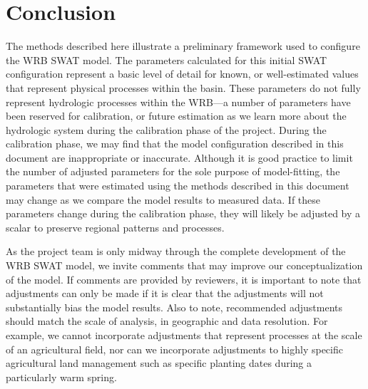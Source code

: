 \section{Conclusion}
The methods described here illustrate a preliminary framework used to configure the WRB SWAT model. The parameters calculated for this initial SWAT configuration represent a basic level of detail for known, or well-estimated values that represent physical processes within the basin. These parameters do not fully represent hydrologic processes within the WRB---a number of parameters have been reserved for calibration, or future estimation as we learn more about the hydrologic system during the calibration phase of the project. During the calibration phase, we may find that the model configuration described in this document are inappropriate or inaccurate. Although it is good practice to limit the number of adjusted parameters for the sole purpose of model-fitting, the parameters that were estimated using the methods described in this document may change as we compare the model results to measured data. If these parameters change during the calibration phase, they will likely be adjusted by a scalar to preserve regional patterns and processes.

As the project team is only midway through the complete development of the WRB SWAT model, we invite comments that may improve our conceptualization of the model. If comments are provided by reviewers, it is important to note that adjustments can only be made if it is clear that the adjustments will not substantially bias the model results. Also to note, recommended adjustments should match the scale of analysis, in geographic and data resolution. For example, we cannot incorporate adjustments that represent processes at the scale of an agricultural field, nor can we incorporate adjustments to highly specific agricultural land management such as specific planting dates during a particularly warm spring.


\pagebreak